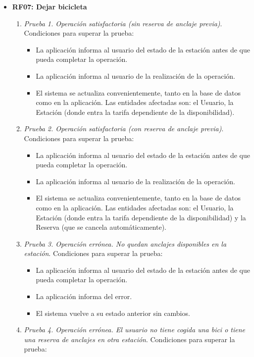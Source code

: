 \begin{itemize}
	\item \textbf{RF07: Dejar bicicleta}
	\begin{enumerate}
		\item \textit{Prueba 1. Operación satisfactoria (sin reserva de anclaje previa)}. Condiciones para superar la prueba:
		\begin{itemize}
			\item La aplicación informa al usuario del estado de la estación antes de que pueda completar la operación.
			\item La aplicación informa al usuario de la realización de la operación.
			\item El sistema se actualiza convenientemente, tanto en la base de datos como en la aplicación. Las entidades afectadas son: el Usuario, la Estación (donde entra la tarifa dependiente de la disponibilidad).
		\end{itemize}
		\item \textit{Prueba 2. Operación satisfactoria (con reserva de anclaje previa)}. Condiciones para superar la prueba:
		\begin{itemize}
			\item La aplicación informa al usuario del estado de la estación antes de que pueda completar la operación.
			\item La aplicación informa al usuario de la realización de la operación.
			\item El sistema se actualiza convenientemente, tanto en la base de datos como en la aplicación. Las entidades afectadas son: el Usuario, la Estación (donde entra la tarifa dependiente de la disponibilidad) y la Reserva (que se cancela automáticamente).
		\end{itemize}
		\item \textit{Prueba 3. Operación errónea. No quedan anclajes disponibles en la estación}. Condiciones para superar la prueba:
		\begin{itemize}
			\item La aplicación informa al usuario del estado de la estación antes de que pueda completar la operación.
			\item La aplicación informa del error.
			\item El sistema vuelve a su estado anterior sin cambios.
		\end{itemize}
		\item \textit{Prueba 4. Operación errónea. El usuario no tiene cogida una bici o tiene una reserva de anclajes en otra estación}. Condiciones para superar la prueba:
		\begin{itemize}

\end{itemize}
\end{enumerate}
\end{itemize}
